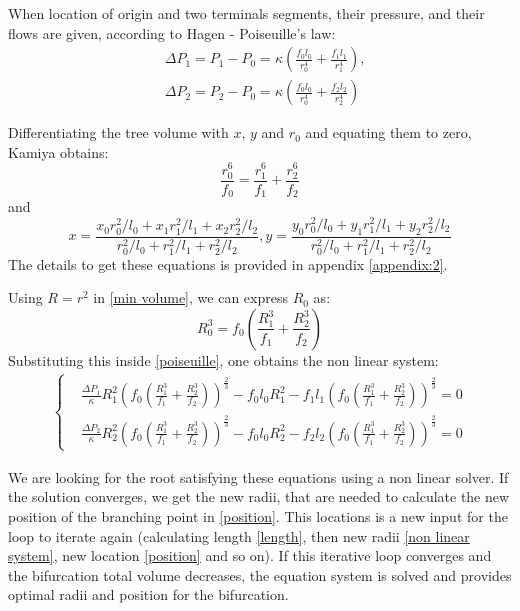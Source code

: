 \documentclass[a4paper, 11pt]{article} %
\begin{document}
When location of origin and two terminals segments, their pressure, and their flows are given, according to Hagen - Poiseuille's law:
\begin{align}
&\Delta P_1 = P_1 - P_0 = \kappa(\frac{f_0l_0}{r_0^4} + \frac{f_1l_1}{r_1^4}), \\
&\Delta P_2 = P_2 - P_0 = \kappa(\frac{f_0l_0}{r_0^4} + \frac{f_2l_2}{r_2^4})
\label{poiseuille}
\end{align}
  
Differentiating the tree volume with $x$, $y$ and $r_0$ and equating them to zero, Kamiya obtains:
\begin{equation}
\frac{r_0^6}{f_0} = \frac{r_1^6}{f_1} + \frac{r_2^6}{f_2}
\label{min volume}
\end{equation}
and 
\begin{equation}
x = \frac{x_0 r_0^2/l_0 + x_1 r_1^2/l_1 + x_2 r_2^2/l_2}{r_0^2/l_0 + r_1^2/l_1 + r_2^2 / l_2},
y = \frac{y_0 r_0^2/l_0 + y_1 r_1^2/l_1 + y_2 r_2^2/l_2}{r_0^2/l_0 + r_1^2/l_1 + r_2^2 / l_2}
\label{position}
\end{equation}
The details to get these equations is provided in appendix \ref{appendix:2}.

Using $R = r^2$ in \eqref{min volume}, we can express $R_0$ as:
\begin{equation}
R_0^3 = f_0(\frac{R_1^3}{f_1} + \frac{R_2^3}{f_2})
\end{equation} 
Substituting this inside \eqref{poiseuille}, one obtains the non linear system:
\begin{align}
\begin{cases}
&\frac{\Delta P_1}{\kappa}R_1^2 \left(f_0(\frac{R_1^3}{f_1} + \frac{R_2^3}{f_2}) \right)^\frac{2}{3} -f_0l_0R_1^2 - f_1l_1\left(f_0(\frac{R_1^3}{f_1} + \frac{R_2^3}{f_2}) \right)^\frac{2}{3} = 0 \\
&\frac{\Delta P_2}{\kappa}R_2^2 \left(f_0(\frac{R_1^3}{f_1} + \frac{R_2^3}{f_2}) \right)^\frac{2}{3} -f_0l_0R_2^2 - f_2l_2\left(f_0(\frac{R_1^3}{f_1} + \frac{R_2^3}{f_2}) \right)^\frac{2}{3} = 0
\end{cases}
\label{non linear system}
\end{align}

We are looking for the root satisfying these equations using a non linear solver. If the solution converges, we get the new radii, that are needed to calculate the new position of the branching point in \eqref{position}. This locations is a new input for the loop to iterate again (calculating length \eqref{length}, then new radii \eqref{non linear system}, new location \eqref{position} and so on). 
If this iterative loop converges and the bifurcation total volume decreases, the equation system is solved and provides optimal radii and position for the bifurcation.
\end{document}
